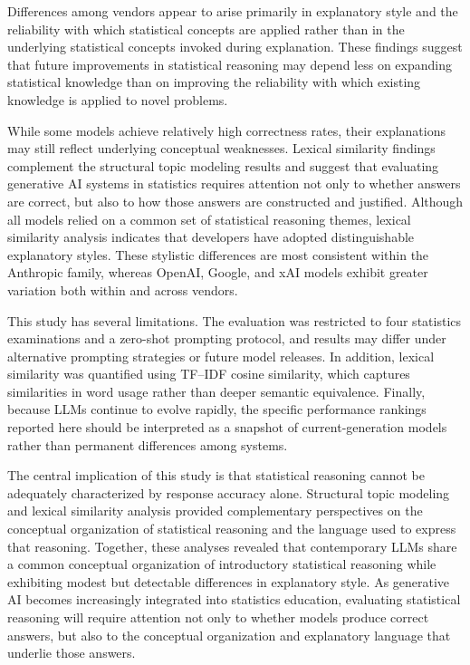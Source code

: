 \documentclass[APA,LATO2COL]{WileyNJDv5}
\begin{document}
Differences among vendors appear to arise primarily in explanatory style and the reliability with which statistical concepts are applied rather than in the underlying statistical concepts invoked during explanation. These findings suggest that future improvements in statistical reasoning may depend less on expanding statistical knowledge than on improving the reliability with which existing knowledge is applied to novel problems.

While some models achieve relatively high correctness rates, their explanations may still reflect underlying conceptual weaknesses. Lexical similarity findings complement the structural topic modeling results and suggest that evaluating generative AI systems in statistics requires attention not only to whether answers are correct, but also to how those answers are constructed and justified. Although all models relied on a common set of statistical reasoning themes, lexical similarity analysis indicates that developers have adopted distinguishable explanatory styles. These stylistic differences are most consistent within the Anthropic family, whereas OpenAI, Google, and xAI models exhibit greater variation both within and across vendors.

This study has several limitations. The evaluation was restricted to four statistics examinations and a zero-shot prompting protocol, and results may differ under alternative prompting strategies or future model releases. In addition, lexical similarity was quantified using TF–IDF cosine similarity, which captures similarities in word usage rather than deeper semantic equivalence. Finally, because LLMs continue to evolve rapidly, the specific performance rankings reported here should be interpreted as a snapshot of current-generation models rather than permanent differences among systems.

The central implication of this study is that statistical reasoning cannot be adequately characterized by response accuracy alone. Structural topic modeling and lexical similarity analysis provided complementary perspectives on the conceptual organization of statistical reasoning and the language used to express that reasoning. Together, these analyses revealed that contemporary LLMs share a common conceptual organization of introductory statistical reasoning while exhibiting modest but detectable differences in explanatory style. As generative AI becomes increasingly integrated into statistics education, evaluating statistical reasoning will require attention not only to whether models produce correct answers, but also to the conceptual organization and explanatory language that underlie those answers.
\end{document}
